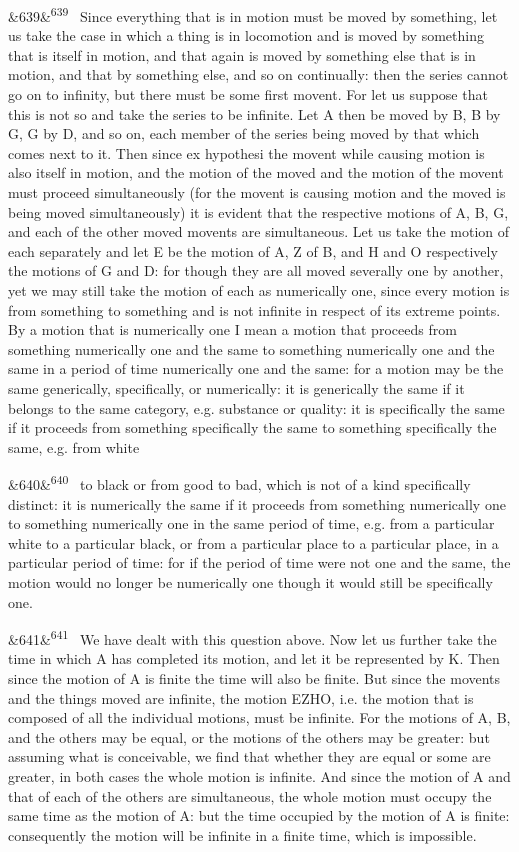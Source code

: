 \documentclass[12pt]{article}
\newcommand{\para}[1][]{\par\noindent\ifx&#1&\else\textsuperscript{\footnotesize #1}~\fi}
\begin{document}
\para[639] Since everything that is in motion must be moved by something, let us take the case in which a thing is in locomotion and is moved by something that is itself in motion, and that again is moved by something else that is in motion, and that by something else, and so on continually: then the series cannot go on to infinity, but there must be some first movent. For let us suppose that this is not so and take the series to be infinite. Let A then be moved by B, B by G, G by D, and so on, each member of the series being moved by that which comes next to it. Then since ex hypothesi the movent while causing motion is also itself in motion, and the motion of the moved and the motion of the movent must proceed simultaneously (for the movent is causing motion and the moved is being moved simultaneously) it is evident that the respective motions of A, B, G, and each of the other moved movents are simultaneous. Let us take the motion of each separately and let E be the motion of A, Z of B, and H and O respectively the motions of G and D: for though they are all moved severally one by another, yet we may still take the motion of each as numerically one, since every motion is from something to something and is not infinite in respect of its extreme points. By a motion that is numerically one I mean a motion that proceeds from something numerically one and the same to something numerically one and the same in a period of time numerically one and the same: for a motion may be the same generically, specifically, or numerically: it is generically the same if it belongs to the same category, e.g. substance or quality: it is specifically the same if it proceeds from something specifically the same to something specifically the same, e.g. from white

\para[640] to black or from good to bad, which is not of a kind specifically distinct: it is numerically the same if it proceeds from something numerically one to something numerically one in the same period of time, e.g. from a particular white to a particular black, or from a particular place to a particular place, in a particular period of time: for if the period of time were not one and the same, the motion would no longer be numerically one though it would still be specifically one.

\para[641] We have dealt with this question above. Now let us further take the time in which A has completed its motion, and let it be represented by K. Then since the motion of A is finite the time will also be finite. But since the movents and the things moved are infinite, the motion EZHO, i.e. the motion that is composed of all the individual motions, must be infinite. For the motions of A, B, and the others may be equal, or the motions of the others may be greater: but assuming what is conceivable, we find that whether they are equal or some are greater, in both cases the whole motion is infinite. And since the motion of A and that of each of the others are simultaneous, the whole motion must occupy the same time as the motion of A: but the time occupied by the motion of A is finite: consequently the motion will be infinite in a finite time, which is impossible.
\end{document}
